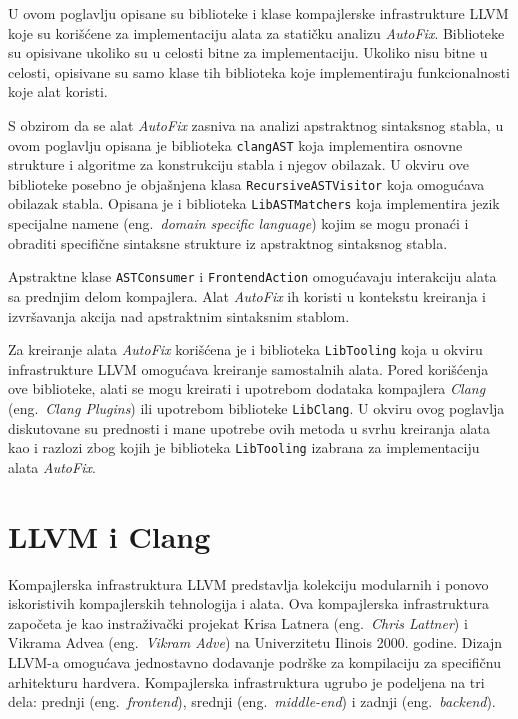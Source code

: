 \documentclass[12pt,oneside]{memoir}
\begin{document}
U ovom poglavlju opisane su biblioteke i klase kompajlerske infrastrukture LLVM koje su kori\v{s}\'{c}ene za implementaciju alata za stati\v{c}ku analizu \textit{AutoFix}. Biblioteke su opisivane ukoliko su u celosti
bitne za implementaciju. Ukoliko nisu bitne u celosti, opisivane su samo klase tih biblioteka koje implementiraju funkcionalnosti koje alat koristi. \par 
S obzirom da se alat \textit{AutoFix} zasniva na analizi apstraktnog sintaksnog stabla, u ovom poglavlju opisana je biblioteka \texttt{clangAST} koja implementira osnovne
strukture i algoritme za konstrukciju stabla i njegov obilazak. U okviru ove biblioteke posebno je obja\v{s}njena klasa \texttt{RecursiveASTVisitor} koja omogu\'{c}ava obilazak stabla.
Opisana je i biblioteka \texttt{LibASTMatchers} koja implementira jezik specijalne namene (eng.~\textit{domain specific language}) kojim se mogu prona\'{c}i i obraditi specifi\v{c}ne sintaksne strukture iz apstraktnog sintaksnog stabla.
\par
Apstraktne klase \texttt{ASTConsumer} i \texttt{FrontendAction} omogu\'{c}avaju interakciju alata sa prednjim delom kompajlera. Alat \textit{AutoFix} ih
koristi u kontekstu kreiranja i izvr\v{s}avanja akcija nad apstraktnim sintaksnim
stablom.
\par
Za kreiranje alata \textit{AutoFix} kori\v{s}\'{c}ena je i biblioteka \texttt{LibTooling} koja u okviru infrastrukture LLVM omogu\'{c}ava kreiranje samostalnih alata. Pored kori\v{s}\'{c}enja ove biblioteke, alati se mogu kreirati i upotrebom dodataka kompajlera \textit{Clang} (eng.~\textit{Clang Plugins}) ili upotrebom biblioteke \texttt{LibClang}. U okviru ovog poglavlja diskutovane su prednosti i mane upotrebe ovih metoda u svrhu kreiranja alata kao i razlozi zbog kojih je biblioteka \texttt{LibTooling} izabrana za implementaciju alata \textit{AutoFix}.

\section{LLVM i Clang}

Kompajlerska infrastruktura LLVM predstavlja kolekciju modularnih i ponovo iskoristivih kompajlerskih tehnologija i alata.
Ova kompajlerska infrastruktura zapo\v{c}eta je kao instraživački projekat Krisa Latnera (eng.~\textit{Chris Lattner}) i Vikrama Advea (eng.~\textit{Vikram Adve}) na Univerzitetu Ilinois 2000. godine.
Dizajn LLVM-a omogu\'{c}ava jednostavno dodavanje podr\v{s}ke za kompilaciju za specifi\v{c}nu arhitekturu hardvera. Kompajlerska infrastruktura
ugrubo je podeljena na tri dela: prednji (eng.~\textit{frontend}), srednji (eng.~\textit{middle-end}) i zadnji (eng.~\textit{backend}). 
\end{document}
